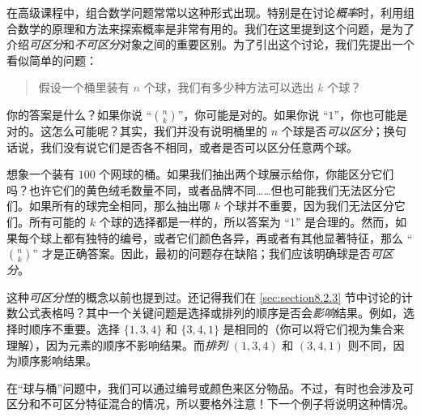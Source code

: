 在高级课程中，组合数学问题常常以这种形式出现。特别是在讨论\emph{概率}时，利用组合数学的原理和方法来探索概率是非常有用的。我们在这里提到这个问题，是为了介绍\emph{可区分}和\emph{不可区分}对象之间的重要区别。为了引出这个讨论，我们先提出一个看似简单的问题：
\begin{quotation}
    假设一个桶里装有 $n$ 个球，我们有多少种方法可以选出 $k$ 个球？
\end{quotation}
你的答案是什么？如果你说 ``${n \choose k}$''，你可能是对的。如果你说 ``$1$''，你也可能是对的。这怎么可能呢？其实，我们并没有说明桶里的 $n$ 个球是否\emph{可以区分}；换句话说，我们没有说它们是否各不相同，或者是否可以区分任意两个球。

想象一个装有 $100$ 个网球的桶。如果我们抽出两个球展示给你，你能区分它们吗？也许它们的黄色绒毛数量不同，或者品牌不同……但也可能我们无法区分它们。如果所有的球完全相同，那么抽出哪 $k$ 个球并不重要，因为我们无法区分它们。所有可能的 $k$ 个球的选择都是一样的，所以答案为 ``1'' 是合理的。然而，如果每个球上都有独特的编号，或者它们颜色各异，再或者有其他显著特征，那么 ``${n \choose k}$'' 才是正确答案。因此，最初的问题存在缺陷；我们应该明确球是否\emph{可区分}。

这种\emph{可区分性}的概念以前也提到过。还记得我们在 \ref{sec:section8.2.3} 节中讨论的计数公式表格吗？其中一个关键问题是选择或排列的顺序是否会\emph{影响}结果。例如，选择时顺序不重要。选择 $\{1, 3, 4\}$ 和 $\{3, 4, 1\}$ 是相同的（你可以将它们视为集合来理解），因为元素的顺序不影响结果。而\emph{排列} $(1, 3, 4)$ 和 $(3, 4, 1)$ 则不同，因为顺序影响结果。

在``球与桶''问题中，我们可以通过编号或颜色来区分物品。不过，有时也会涉及可区分和不可区分特征混合的情况，所以要格外注意！下一个例子将说明这种情况。\\

